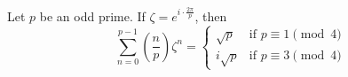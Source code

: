 Let $p$ be an odd prime. If $\zeta=e^{i\cdot\frac{2\pi}{p}}$, then
\[
	\sum_{n=0}^{p-1}\left(\frac{n}{p}\right)\zeta^n=
	\begin{cases}
		\sqrt{p} & \text{if }p\equiv1\pmod{4} \\
		i\sqrt{p} & \text{if }p\equiv3\pmod{4}
	\end{cases}
\]